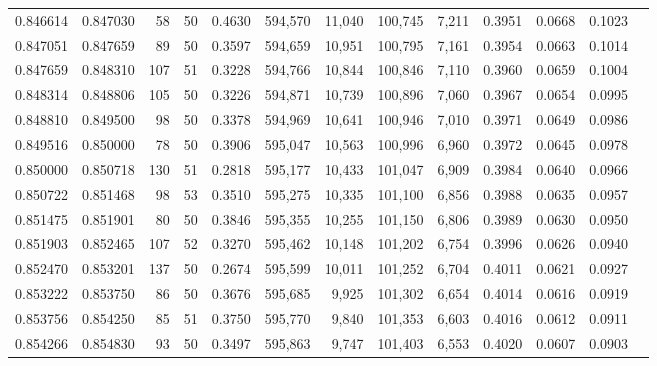 \begin{tabular}{rrrrrrrrrrrrr}
0.846614 & 0.847030 &    58 &  50 &                                     0.4630 & 594,570 &  11,040 & 100,745 &   7,211 & 0.3951 & 0.0668 & 0.1023 \\
0.847051 & 0.847659 &    89 &  50 &                                     0.3597 & 594,659 &  10,951 & 100,795 &   7,161 & 0.3954 & 0.0663 & 0.1014 \\
0.847659 & 0.848310 &   107 &  51 &                                     0.3228 & 594,766 &  10,844 & 100,846 &   7,110 & 0.3960 & 0.0659 & 0.1004 \\
0.848314 & 0.848806 &   105 &  50 &                                     0.3226 & 594,871 &  10,739 & 100,896 &   7,060 & 0.3967 & 0.0654 & 0.0995 \\
0.848810 & 0.849500 &    98 &  50 &                                     0.3378 & 594,969 &  10,641 & 100,946 &   7,010 & 0.3971 & 0.0649 & 0.0986 \\
0.849516 & 0.850000 &    78 &  50 &                                     0.3906 & 595,047 &  10,563 & 100,996 &   6,960 & 0.3972 & 0.0645 & 0.0978 \\
0.850000 & 0.850718 &   130 &  51 &                                     0.2818 & 595,177 &  10,433 & 101,047 &   6,909 & 0.3984 & 0.0640 & 0.0966 \\
0.850722 & 0.851468 &    98 &  53 &                                     0.3510 & 595,275 &  10,335 & 101,100 &   6,856 & 0.3988 & 0.0635 & 0.0957 \\
0.851475 & 0.851901 &    80 &  50 &                                     0.3846 & 595,355 &  10,255 & 101,150 &   6,806 & 0.3989 & 0.0630 & 0.0950 \\
0.851903 & 0.852465 &   107 &  52 &                                     0.3270 & 595,462 &  10,148 & 101,202 &   6,754 & 0.3996 & 0.0626 & 0.0940 \\
0.852470 & 0.853201 &   137 &  50 &                                     0.2674 & 595,599 &  10,011 & 101,252 &   6,704 & 0.4011 & 0.0621 & 0.0927 \\
0.853222 & 0.853750 &    86 &  50 &                                     0.3676 & 595,685 &   9,925 & 101,302 &   6,654 & 0.4014 & 0.0616 & 0.0919 \\
0.853756 & 0.854250 &    85 &  51 &                                     0.3750 & 595,770 &   9,840 & 101,353 &   6,603 & 0.4016 & 0.0612 & 0.0911 \\
0.854266 & 0.854830 &    93 &  50 &                                     0.3497 & 595,863 &   9,747 & 101,403 &   6,553 & 0.4020 & 0.0607 & 0.0903 \\

\end{tabular}
